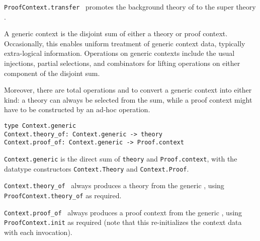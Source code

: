 \begin{isabellebody}
\begin{isamarkuptext}
\begin{description}
  \item \verb|ProofContext.transfer|~ promotes the
  background theory of  to the super theory .

  \end{description}%
\end{isamarkuptext}%
\isamarkuptrue%
%
\endisatagmlref
{\isafoldmlref}%
%
\isadelimmlref
%
\endisadelimmlref
%
\isamarkuptrue%
%
\begin{isamarkuptext}%
A generic context is the disjoint sum of either a theory or proof
  context.  Occasionally, this enables uniform treatment of generic
  context data, typically extra-logical information.  Operations on
  generic contexts include the usual injections, partial selections,
  and combinators for lifting operations on either component of the
  disjoint sum.

  Moreover, there are total operations  and  to convert a generic context into either kind: a theory
  can always be selected from the sum, while a proof context might
  have to be constructed by an ad-hoc  operation.%
\end{isamarkuptext}%
\isamarkuptrue%
%
\isadelimmlref
%
\endisadelimmlref
%
\isatagmlref
%
\begin{isamarkuptext}%
\begin{mldecls}
  \verb|type Context.generic| \\
  \verb|Context.theory_of: Context.generic -> theory| \\
  \verb|Context.proof_of: Context.generic -> Proof.context| \\
  \end{mldecls}

  \begin{description}

  \item \verb|Context.generic| is the direct sum of \verb|theory| and \verb|Proof.context|, with the datatype
  constructors \verb|Context.Theory| and \verb|Context.Proof|.

  \item \verb|Context.theory_of|~ always produces a
  theory from the generic , using \verb|ProofContext.theory_of| as required.

  \item \verb|Context.proof_of|~ always produces a
  proof context from the generic , using \verb|ProofContext.init| as required (note that this re-initializes the
  context data with each invocation).


\end{description}
\end{isamarkuptext}
\end{isabellebody}
